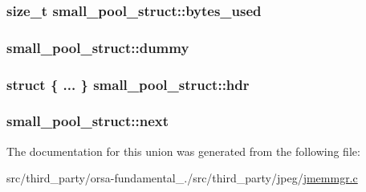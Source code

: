 \subsubsection[{bytes\+\_\+used}]{\setlength{\rightskip}{0pt plus 5cm}size\+\_\+t small\+\_\+pool\+\_\+struct\+::bytes\+\_\+used}\label{unionsmall__pool__struct_abe8273ffbd9403c060714752d28ef95f}
\hypertarget{unionsmall__pool__struct_a73cdd7a86eb8b88c7e4e9ff91aee3f99}{}
\subsubsection[{dummy}]{ small\+\_\+pool\+\_\+struct\+::dummy}\label{unionsmall__pool__struct_a73cdd7a86eb8b88c7e4e9ff91aee3f99}
\hypertarget{unionsmall__pool__struct_aa49a2258b7552bf5ec0302434d862fbf}{}
\subsubsection[{hdr}]{\setlength{\rightskip}{0pt plus 5cm}struct \{ ... \}   small\+\_\+pool\+\_\+struct\+::hdr}\label{unionsmall__pool__struct_aa49a2258b7552bf5ec0302434d862fbf}
\hypertarget{unionsmall__pool__struct_a35adccff412d109347d363744d0bcd19}{}
\subsubsection[{next}]{ small\+\_\+pool\+\_\+struct\+::next}\label{unionsmall__pool__struct_a35adccff412d109347d363744d0bcd19}


The documentation for this union was generated from the following file\+:\begin{DoxyCompactItemize}
\item 
src/third\+\_\+party/orsa-\/fundamental\+\_./src/third\+\_\+party/jpeg/\hyperlink{jmemmgr_8c}{jmemmgr.\+c}\end{DoxyCompactItemize}

